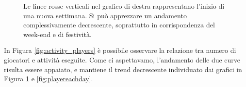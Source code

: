 \begin{figure}
	\hfill
	\caption{Le linee rosse verticali nel grafico di destra rappresentano l'inizio di una nuova settimana. Si può apprezzare un andamento complessivamente decrescente, soprattutto in corrispondenza del week-end e di festività.}
	\label{fig:activity_each_day}
\end{figure}
In Figura \ref{fig:activity_players} è possibile osservare la relazione tra numero di giocatori e attività eseguite. Come ci aspettavamo, l'andamento delle due curve risulta essere appaiato, e mantiene il trend decrescente individuato dai grafici in Figura \ref{fig:activity_each_day} e \ref{fig:playereachday}.
